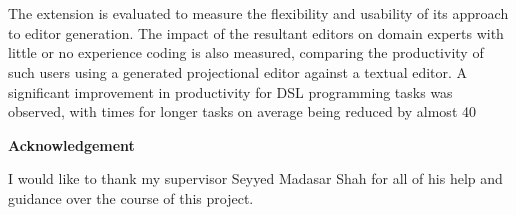 \documentclass{article}
\begin{document}
\\
\\
The extension is evaluated to measure the flexibility and usability of its approach to editor generation. The impact of the resultant editors on domain experts with little or no experience coding is also measured, comparing the productivity of such users using a generated projectional editor against a textual editor. A significant improvement in productivity for DSL programming tasks was observed, with times for longer tasks on average being reduced by almost 40%
\begin{center}
	\vspace {1.5cm}
    \Large
    \textbf{Acknowledgement}
\end{center}
I would like to thank my supervisor Seyyed Madasar Shah for all of his help and guidance over the course of this project.



\end{document}
